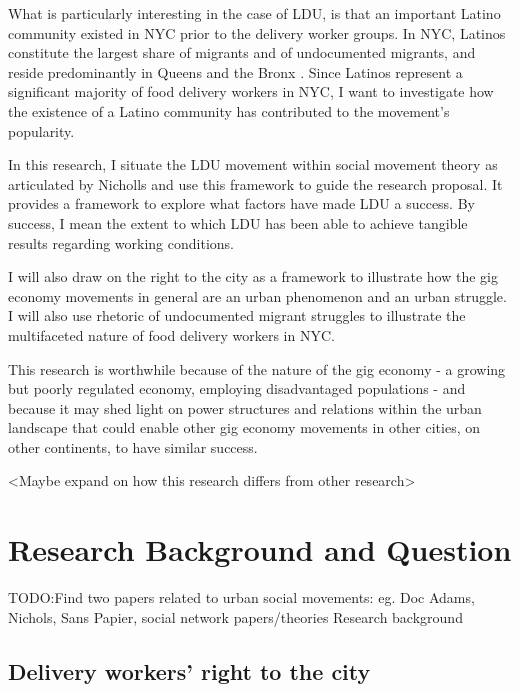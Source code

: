 \documentclass{article}
\begin{document}
What is particularly interesting in the case of LDU, is that an important Latino community existed in NYC prior to the delivery worker groups. In NYC, Latinos constitute the largest share of migrants and of undocumented migrants, and reside predominantly in Queens and the Bronx \parencite{nycimmigrantpopulation2021}. Since Latinos represent a significant majority of food delivery workers in NYC, I want to investigate how the existence of a Latino community has contributed to the movement’s popularity.

In this research, I situate the LDU movement within social movement theory as articulated by Nicholls and use this framework to guide the research proposal. It provides a framework to explore what factors have made LDU a success. By success, I mean the extent to which LDU has been able to achieve tangible results regarding working conditions.

I will also draw on the right to the city as a framework to illustrate how the gig economy movements in general are an urban phenomenon and an urban struggle. I will also use rhetoric of undocumented migrant struggles to illustrate the multifaceted nature of food delivery workers in NYC.

This research is worthwhile because of the nature of the gig economy - a growing but poorly regulated economy, employing disadvantaged populations - and because it may shed light on power structures and relations within the urban landscape that could enable other gig economy movements in other cities, on other continents, to have similar success.

<Maybe expand on how this research differs from other research>

\section{Research Background and Question}

TODO:Find two papers related to urban social movements: eg. Doc Adams, Nichols, Sans Papier, social network papers/theories
Research background

\subsection{Delivery workers’ right to the city}
\end{document}
